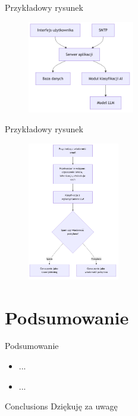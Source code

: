 \documentclass[12]{beamer}
\begin{document}
\begin{frame}{Przykładowy rysunek}
  \begin{figure}[t]
    \centering
    \includegraphics[height=4cm]{images/app_arch.png}
  \end{figure}
\end{frame}


\begin{frame}{Przykładowy rysunek}
  \begin{figure}[t]
    \centering
    \includegraphics[height=6cm]{images/diagram.png}
  \end{figure}
\end{frame}

\section{Podsumowanie}

\begin{frame}{Podsumowanie}
\normalsize{
  \begin{itemize}
  \item
    ...
  \item
    ...
  \end{itemize}
}
\end{frame}

\begin{frame}{Conclusions}
	\center
		{Dziękuję za uwagę}
\end{frame}
\end{document}
